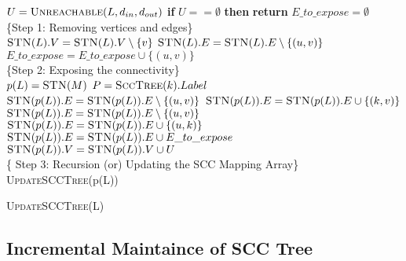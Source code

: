 \begin{algorithm}[H]
    \SetAlgoLined
    $U = \text{\textsc{Unreachable}}(L, d_{in}, d_{out})$\;
    \textbf{if} {$U == \emptyset$} \textbf{then} \textbf{return}\;
    $E\_to\_expose = \emptyset$\;
    \hspace{1em}\\    \{Step 1: Removing vertices and edges\} \\
     {
        $\text{\textsc{STN}}(L).V = \text{\textsc{STN}}(L).V \setminus \{v\}$\;
    }
     {
         {
            $\text{\textsc{STN}}(L).E = \text{\textsc{STN}}(L).E \setminus \{(u, v)\}$\;
            $E\_to\_expose = E\_to\_expose \cup \{(u, v)\}$\;
        }
    }
    \phantom{text}\\   \{Step 2: Exposing the connectivity\} \\
     {
        $p(L) = \textsc{STN}(M)$\;
    }
     {
         {
            $P = \textsc{SccTree}(k).Label$\;
             {
                $\textsc{STN}(p(L)).E = \textsc{STN}(p(L)).E \setminus \{(u, v)\}$\;
                $\textsc{STN}(p(L)).E = \textsc{STN}(p(L)).E \cup \{(k, v)\}$\;
            }
             {
                $\textsc{STN}(p(L)).E = \textsc{STN}(p(L)).E \setminus \{(u, v)\}$\;
                $\textsc{STN}(p(L)).E = \textsc{STN}(p(L)).E \cup \{(u, k)\}$\;
            }
        }
    }
    $\textsc{STN}(p(L)).E = \textsc{STN}(p(L)).E \cup E\_to\_expose$\;
    $\textsc{STN}(p(L)).V = \textsc{STN}(p(L)).V \cup U$\;
    \phantom{text}\\   \{ Step 3: Recursion (or) Updating the SCC Mapping Array\} \\
     {
        \textsc{UpdateSCCTree}(p(L))\;
    }

    \caption{\textsc{UpdateSCCTree}(L)}
\end{algorithm}





\subsection{Incremental Maintaince of SCC Tree}\label{Subsec: Incremental Maintaince of SCC Tree}

